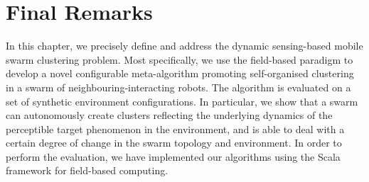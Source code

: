 
\section{Final Remarks}
\label{s:conc}


In this chapter, we precisely define and address
 the dynamic sensing-based mobile swarm clustering problem.
%
Most specifically,
 we use the field-based paradigm
 to develop a novel configurable meta-algorithm
 promoting self-organised clustering in a swarm
 of neighbouring-interacting robots.
%
The algorithm is evaluated on a set of synthetic environment configurations.
%
In particular, we show that a swarm can autonomously
 create clusters reflecting the underlying dynamics of the  perceptible target phenomenon in the environment,
 and is able to deal with a certain degree of change in the swarm topology and environment.
%
In order to perform the evaluation, we have implemented our algorithms using the \scafi{} Scala framework for field-based computing.

\printbibliography